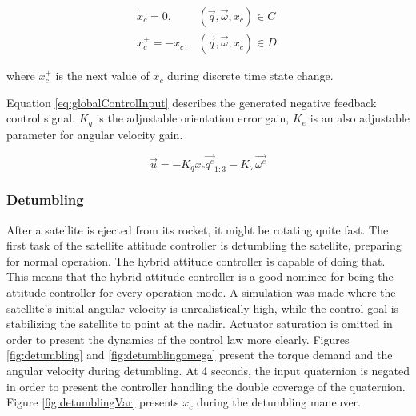 \begin{align}
	\label{eq:globalCont}
\dot{x}_c = 0, & (\vec{q},\vec{\omega},x_c)  \in C \\
\label{eq:globalDiscont}
x_c^+ = -x_c, & (\vec{q},\vec{\omega},x_c) \in D\
\end{align}

where $x_c^+$ is the next value of $x_c$ during discrete time state change.

Equation \ref{eq:globalControlInput} describes the generated negative feedback control signal. $K_q$ is the adjustable orientation error gain, $K_e$ is an also adjustable parameter for angular velocity gain.

\begin{equation}
\label{eq:globalControlInput}
\vec{u} = -K_q x_c \vec{q^e}_{1:3} -K_\omega \vec{\omega^e}
\end{equation}




\subsubsection{Detumbling}

After a satellite is ejected from its rocket, it might be rotating quite fast. The first task of the satellite attitude controller is detumbling the satellite, preparing for normal operation. The hybrid attitude controller is capable of doing that. This means that the hybrid attitude controller is a good nominee for being the attitude controller for every operation mode. A simulation was made where the satellite's initial angular velocity is unrealistically high, while the control goal is stabilizing the satellite to point at the nadir. Actuator saturation is omitted in order to present the dynamics of the control law more clearly. Figures \ref{fig:detumbling} and \ref{fig:detumblingomega} present the torque demand and the angular velocity during detumbling. At 4 seconds, the input quaternion is negated in order to present the controller handling the double coverage of the quaternion. Figure \ref{fig:detumblingVar} presents $x_c$ during the detumbling maneuver.

